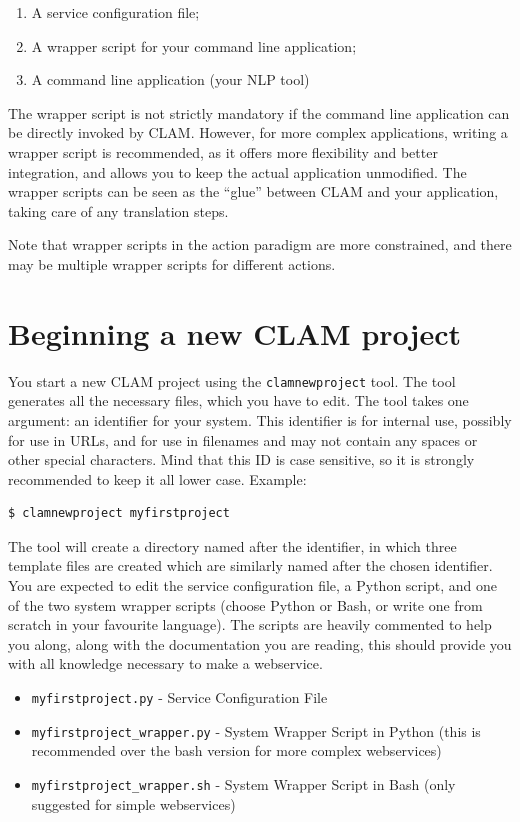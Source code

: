 \documentclass[a4paper,12pt,twoside,openright]{report}
\begin{document}
\begin{enumerate}
\item A service configuration file;
\item A wrapper script for your command line application;
\item A command line application (your NLP tool)
\end{enumerate}

The wrapper script is not strictly mandatory if the command line application can be
directly invoked by CLAM. However, for more complex applications, writing a
wrapper script is recommended, as it offers more flexibility and
better integration, and allows you to keep the actual application
unmodified. The wrapper scripts can be seen as the ``glue'' between CLAM and
your application, taking care of any translation steps.

Note that wrapper scripts in the action paradigm are more constrained,  and
there may be multiple wrapper scripts for different actions.

\section{Beginning a new CLAM project}

You start a new CLAM project using the \texttt{clamnewproject} tool. The tool
generates all the necessary files, which you have to edit.  The tool takes one
argument: an identifier for your system. This identifier is for internal use,
possibly for use in URLs, and for use in filenames and may not contain any
spaces or other special characters. Mind that this ID is case sensitive, so it
is strongly recommended to keep it all lower case. Example:

{ \small
\begin{verbatim}
$ clamnewproject myfirstproject 
\end{verbatim}
}

The tool will create a directory named after the identifier, in which three
template files are created which are similarly named after the chosen
identifier. You are expected to edit the service configuration file, a Python
script, and one of the two system wrapper scripts (choose Python or Bash, or write
one from scratch in your favourite language). The scripts are heavily commented
to help you along, along with the documentation you are reading, this should
provide you with all knowledge necessary to make a webservice.

\begin{itemize}
\item \texttt{myfirstproject.py} - Service Configuration File
\item \texttt{myfirstproject\_wrapper.py} - System Wrapper Script in Python (this is recommended over the bash version for more complex webservices)
\item \texttt{myfirstproject\_wrapper.sh} - System Wrapper Script in Bash (only suggested for simple webservices)
\end{itemize}
\end{document}
